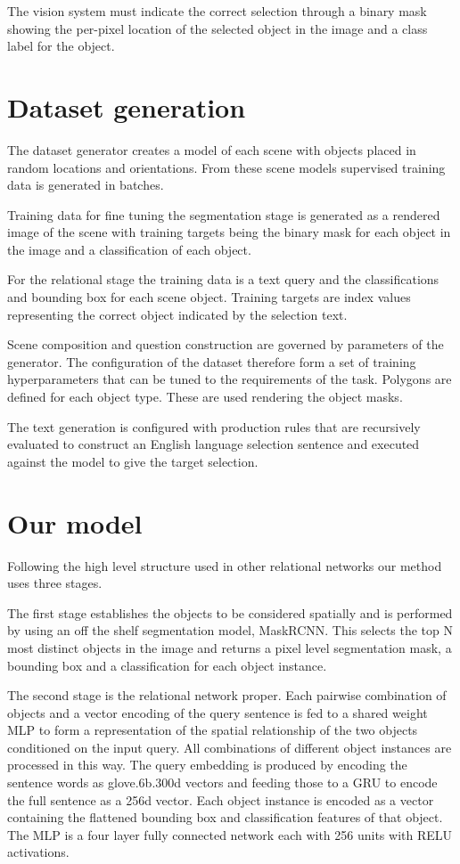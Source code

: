 \documentclass[conference]{IEEEtran}
\begin{document}
The vision system must indicate the correct selection through a binary mask showing the per-pixel location of the selected object in the image and a class label for the object. 

    \section{Dataset generation}

The dataset generator creates a model of each scene with objects placed in random locations and orientations.  From these scene models supervised training data is generated in batches. 

Training data for fine tuning the segmentation stage is generated as a rendered image of the scene with training targets being the binary mask for each object in the image and a classification of each object.

For the relational stage the training data is a text query and the classifications and bounding box for each scene object.  Training targets are index values representing the correct object indicated by the selection text. 

Scene composition and question construction are governed by parameters of the generator. The configuration of the dataset therefore form a set of training hyperparameters that can be tuned to the requirements of the task.  Polygons are defined for each object type.  These are used rendering the object masks. 

The text generation is configured with production rules that are recursively evaluated to construct an English language selection sentence and executed against the model to give the target selection. 

    \section{Our model} 
    
Following the high level structure used in other relational networks\cite{RN1} our method uses three stages.   

The first stage establishes the objects to be considered spatially and is performed by using an off the shelf segmentation model, MaskRCNN.  This selects the top N most distinct objects in the image and returns a pixel level segmentation mask, a bounding box and a classification for each object instance.  

The second stage is the relational network proper. Each pairwise combination of objects and a vector encoding of the query sentence is fed to a shared weight MLP to form a representation of the spatial relationship of the two objects conditioned on the input query.  All combinations of different object instances are processed in this way.  The query embedding is produced by encoding the sentence words as glove.6b.300d vectors and feeding those to a GRU to encode the full sentence as a 256d vector.  Each object instance is encoded as a vector containing the flattened bounding box and classification features of that object.  The MLP is a four layer fully connected network each with 256 units with RELU activations. 
\end{document}
